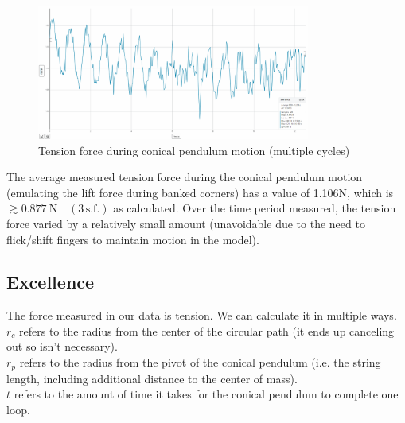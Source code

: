 \documentclass[11pt, a4paper]{article}
\begin{document}
	\begin{figure}[H]
		\centering
		\includegraphics[width=0.8\textwidth]{Images/Conical Pendulum}
		\caption{Tension force during conical pendulum motion (multiple cycles)}
	\end{figure}
	The average measured tension force during the conical pendulum motion (emulating the lift force during banked corners) has a value of 1.106N, which is $\gtrsim\SI{0.877}{\newton} \quad (3\, \text{s.f.})$ as calculated. Over the time period measured, the tension force varied by a relatively small amount (unavoidable due to the need to flick/shift fingers to maintain motion in the model).
	
	
	
	\subsection{Excellence}
	The force measured in our data is tension. We can calculate it in multiple ways.\\[\baselineskip]
	$r_c$ refers to the radius from the center of the circular path (it ends up canceling out so isn't necessary).\\
	$r_p$ refers to the radius from the pivot of the conical pendulum (i.e. the string length, including additional distance to the center of mass).\\
	$t$ refers to the amount of time it takes for the conical pendulum to complete one loop.
	
\end{document}

